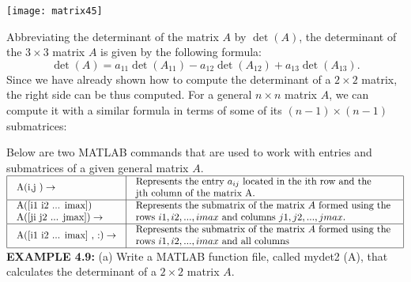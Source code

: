 \documentclass[../main.tex]{subfiles}
\begin{document}
\texttt{[image: matrix45]}

Abbreviating the determinant of the matrix $A$ by $\operatorname{det}(A)$, the determinant of the $3 \times 3$ matrix $A$ is given by the following formula:
$$
\operatorname{det}(A)=a_{11} \operatorname{det}\left(A_{11}\right)-a_{12} \operatorname{det}\left(A_{12}\right)+a_{13} \operatorname{det}\left(A_{13}\right) .
$$
Since we have already shown how to compute the determinant of a $2 \times 2$ matrix, the right side can be thus computed. For a general $n \times n$ matrix $A$, we can compute it with a similar formula in terms of some of its $(n-1) \times(n-1)$ submatrices:

Below are two MATLAB commands that are used to work with entries and submatrices of a given general matrix $A$.
\\

$
\begin{array}{|l|l|}
\hline \begin{array}{l}
\text {A(i,j )} \rightarrow
\end{array} & \begin{array}{l}
\text {Represents the entry $a_{ij}$ located in the ith row and the } \\
\text{jth column of the matrix A.}
\end{array} \\
\hline \begin{array}{l}
\text {A([i1 i2 ... imax])}\\
\text {A([ji j2 ... jmax])}\rightarrow
\end{array} & \begin{array}{l}
\text {Represents the submatrix of the matrix $A$ formed using the } \\
\text{rows $i1, i2,..., imax$ and columns $j1,j2, ...,jmax.$ }
\end{array} \\
\hline \begin{array}{l}
\text {A([i1 i2 ... imax] , :)} \rightarrow
\end{array} & \begin{array}{l}
\text {Represents the submatrix of the matrix $A$ formed using the } \\
\text{rows $i1, i2,..., imax$ and all columns}
\end{array} \\
\hline
\end{array}
$ \\

\textbf{EXAMPLE 4.9:} (a) Write a MATLAB function file, called mydet2 (A), that calculates the determinant of a $2 \times 2$ matrix $A$.
\end{document}
